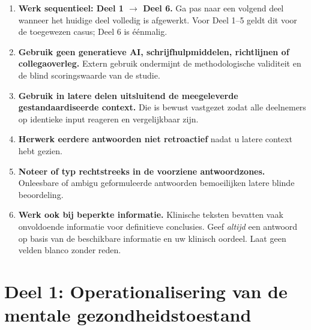 \documentclass[11pt,a4paper]{article}
\begin{document}
\vspace{0.5em}
\begin{instrbox}[title={Werkwijze -- strikt te volgen}]
\begin{enumerate}[topsep=1pt,itemsep=2pt]
\item \textbf{Werk sequentieel: Deel 1 $\rightarrow$ Deel 6.}
Ga pas naar een volgend deel wanneer het huidige deel volledig is afgewerkt. Voor Deel 1--5 geldt dit voor de toegewezen casus; Deel 6 is éénmalig.
\item \textbf{Gebruik geen generatieve AI, schrijfhulpmiddelen, richtlijnen of collegaoverleg.}
Extern gebruik ondermijnt de methodologische validiteit en de blind scoringswaarde van de studie.
\item \textbf{Gebruik in latere delen uitsluitend de meegeleverde gestandaardiseerde context.}
Die is bewust vastgezet zodat alle deelnemers op identieke input reageren en vergelijkbaar zijn.
\item \textbf{Herwerk eerdere antwoorden niet retroactief} nadat u latere context hebt gezien.
\item \textbf{Noteer of typ rechtstreeks in de voorziene antwoordzones.}
Onleesbare of ambigu geformuleerde antwoorden bemoeilijken latere blinde beoordeling.
\item \textbf{Werk ook bij beperkte informatie.} Klinische teksten bevatten vaak onvoldoende informatie voor definitieve conclusies. Geef \emph{altijd} een antwoord op basis van de beschikbare informatie en uw klinisch oordeel. Laat geen velden blanco zonder reden.
\end{enumerate}
\end{instrbox}

\newpage


\section{Deel 1: Operationalisering van de mentale gezondheidstoestand}
\end{document}
